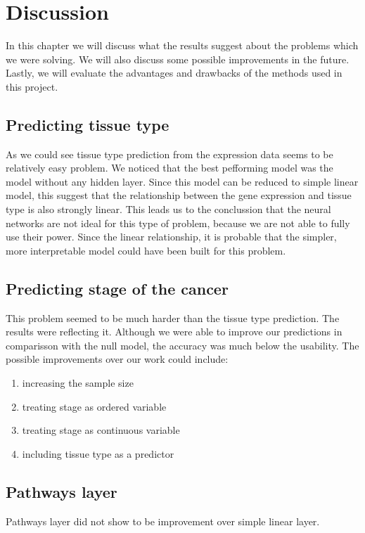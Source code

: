 \chapter{Discussion}
In this chapter we will discuss what the results suggest about the problems which we were solving.
We will also discuss some possible improvements in the future.
Lastly, we will evaluate the advantages and drawbacks of the methods used in this project.

\section{Predicting tissue type}
As we could see tissue type prediction from the expression data seems to be relatively easy problem.
We noticed that the best pefforming model was the model without any hidden layer.
Since this model can be reduced to simple linear model, this suggest that the relationship between the gene expression and tissue type is also strongly linear.
This leads us to the conclussion that the neural networks are not ideal for this type of problem, because we are not able to fully use their power.
Since the linear relationship, it is probable that the simpler, more interpretable model could have been built for this problem.

\section{Predicting stage of the cancer}
This problem seemed to be much harder than the tissue type prediction.
The results were reflecting it.
Although we were able to improve our predictions in comparisson with the null model, the accuracy was much below the usability.
The possible improvements over our work could include:
\begin{enumerate}
    \item increasing the sample size
    \item treating stage as ordered variable
    \item treating stage as continuous variable
    \item including tissue type as a predictor
\end{enumerate} 

\section{Pathways layer}
Pathways layer did not show to be improvement over simple linear layer.